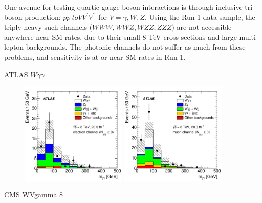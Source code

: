 
One avenue for testing quartic gauge boson interactions is through
inclusive tri-boson production: $pp\ to VV^{\prime}V^{\prime\prime}$
for $V= \gamma, W, Z$.  Using the Run 1 data sample, the triply heavy
such channels ($WWW, WWZ, WZZ, ZZZ$) are not accessible anywhere near
SM rates, due to their small 8 TeV cross sections and large
multi-lepton backgrounds. The photonic channels do not suffer as much
from these problems, and sensitivity is at or near SM rates in Run 1. 

ATLAS $W\gamma\gamma$~\cite{Aad:2015uqa}
\begin{figure}[p]
    \centering
    \includegraphics[width=0.45\textwidth]{figures/ss-inclboson-triboson-wgg-ele-atlas8tev.pdf}
    \includegraphics[width=0.45\textwidth]{figures/ss-inclboson-triboson-wgg-mu-atlas8tev.pdf}
    \caption{}
    \label{fig:ss-inclboson-triboson-wgg-atlas8tev}
\end{figure}


CMS WVgamma 8 \TeV~\cite{Chatrchyan:2014bza}

